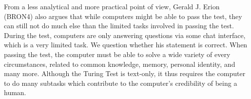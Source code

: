 From a less analytical and more practical point of view, Gerald J. Erion (BRON4) also argues that while computers might be able to pass the test, they can still not do much else than the limited tasks involved in passing the test. During the test, computers are only answering questions via some chat interface, which is a very limited task. We question whether his statement is correct. When passing the test, the computer must be able to solve a wide variety of every circumstances, related to common knowledge, memory, personal identity, and many more. Although the Turing Test is text-only, it thus requires the computer to do many subtasks which contribute to the computer’s credibility of being a human.
